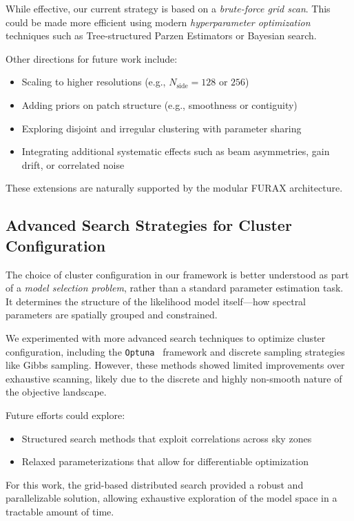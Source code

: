 \documentclass[%
 reprint,
bibnotes,
 amsmath,amssymb,
 aps,
floatfix, 
]{revtex4-2}
\begin{document}
While effective, our current strategy is based on a \textit{brute-force grid scan}. This could be made more efficient using modern \textit{hyperparameter optimization} techniques such as Tree-structured Parzen Estimators or Bayesian search.

Other directions for future work include:
\begin{itemize}
    \item Scaling to higher resolutions (e.g., \( N_{\text{side}} = 128 \) or \( 256 \))
    \item Adding priors on patch structure (e.g., smoothness or contiguity)
    \item Exploring disjoint and irregular clustering with parameter sharing
    \item Integrating additional systematic effects such as beam asymmetries, gain drift, or correlated noise
\end{itemize}

These extensions are naturally supported by the modular \textsc{FURAX} architecture.

\subsection*{Advanced Search Strategies for Cluster Configuration}

The choice of cluster configuration in our framework is better understood as part of a \textit{model selection problem}, rather than a standard parameter estimation task. It determines the structure of the likelihood model itself—how spectral parameters are spatially grouped and constrained.

We experimented with more advanced search techniques to optimize cluster configuration, including the \texttt{Optuna}~\citep{OPTUNA} framework and discrete sampling strategies like Gibbs sampling. However, these methods showed limited improvements over exhaustive scanning, likely due to the discrete and highly non-smooth nature of the objective landscape.

Future efforts could explore:
\begin{itemize}
    \item Structured search methods that exploit correlations across sky zones
    \item Relaxed parameterizations that allow for differentiable optimization
\end{itemize}

For this work, the grid-based distributed search provided a robust and parallelizable solution, allowing exhaustive exploration of the model space in a tractable amount of time.
\end{document}
